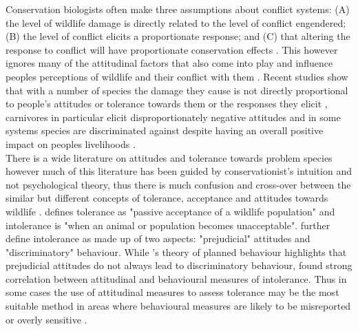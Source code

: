 Conservation biologists often make three assumptions about conflict systems: (A) the level of wildlife damage is directly related to the level of conflict engendered; (B) the level of conflict elicits a proportionate response; and (C) that altering the response to conflict will have proportionate conservation effects  \cite{Dickman2010b}. This however ignores many of the attitudinal factors that also come into play and influence peoples perceptions of wildlife and their conflict with them \cite{Dickman2010b}. Recent studies show that with a number of species the damage they cause is not directly proportional to people's attitudes or tolerance towards them or the responses they elicit \cite{Dickman2010b,Kansky2014d,Kansky2014e,Kansky2016}, carnivores in particular elicit disproportionately negative attitudes \cite{Kansky2014e} and in some systems species are discriminated against despite having an overall positive impact on peoples livelihoods \cite{Dickman2010b,Prowse2014}.\\

There is a wide literature on attitudes and tolerance towards problem species \cite{Kansky2014d,Kansky2014e} however much of this literature has been guided by conservationist's intuition and not psychological theory, thus there is much confusion and cross-over between the similar but different concepts of tolerance, acceptance and attitudes towards wildlife \cite{Bruskotter2015}. \citet{Bruskotter2012} defines tolerance as "passive acceptance of a wildlife population" and intolerance is "when an animal or population becomes unacceptable". \citet{Bruskotter2015,Treves2012b} further define intolerance as made up of two aspects: "prejudicial" attitudes and "discriminatory" behaviour. While \citet{Ajzen1991}'s theory of planned behaviour highlights that prejudicial attitudes do not always lead to discriminatory behaviour, \citet{Bruskotter2015} found strong correlation between attitudinal and behavioural measures of intolerance. Thus in some cases the use of attitudinal measures to assess tolerance may be the most suitable method in areas where behavioural measures are likely to be misreported or overly sensitive \cite{Bruskotter2015}.\\

